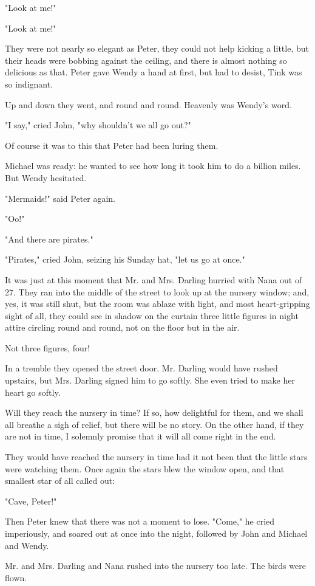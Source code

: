 "Look at me!"


"Look at me!"


They were not nearly so elegant as Peter, they could not help kicking a
little, but their heads were bobbing against the ceiling, and there is
almost nothing so delicious as that. Peter gave Wendy a hand at first, but
had to desist, Tink was so indignant.


Up and down they went, and round and round. Heavenly was Wendy's word.


"I say," cried John, "why shouldn't we all go out?"


Of course it was to this that Peter had been luring them.


Michael was ready: he wanted to see how long it took him to do a billion
miles. But Wendy hesitated.


"Mermaids!" said Peter again.


"Oo!"


"And there are pirates."


"Pirates," cried John, seizing his Sunday hat, "let us go at once."


It was just at this moment that Mr. and Mrs. Darling hurried with Nana out
of 27. They ran into the middle of the street to look up at the nursery
window; and, yes, it was still shut, but the room was ablaze with light,
and most heart-gripping sight of all, they could see in shadow on the
curtain three little figures in night attire circling round and round, not
on the floor but in the air.


Not three figures, four!


In a tremble they opened the street door. Mr. Darling would have rushed
upstairs, but Mrs. Darling signed him to go softly. She even tried to make
her heart go softly.


Will they reach the nursery in time? If so, how delightful for them, and
we shall all breathe a sigh of relief, but there will be no story. On the
other hand, if they are not in time, I solemnly promise that it will all
come right in the end.


They would have reached the nursery in time had it not been that the
little stars were watching them. Once again the stars blew the window
open, and that smallest star of all called out:


"Cave, Peter!"


Then Peter knew that there was not a moment to lose. "Come," he cried
imperiously, and soared out at once into the night, followed by John and
Michael and Wendy.


Mr. and Mrs. Darling and Nana rushed into the nursery too late. The birds
were flown.

